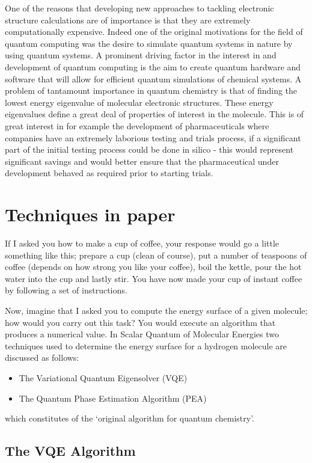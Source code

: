 \documentclass[12pt]{article}
\begin{document}
One of the reasons that developing new approaches to tackling electronic structure calculations are of importance is that they are extremely computationally expensive. Indeed one of the original motivations for the field of quantum computing was the desire to simulate quantum systems in nature by using quantum systems. A prominent driving factor in the interest in and development of quantum computing is the aim to create quantum hardware and software that will allow for efficient quantum simulations of chemical systems. A problem of tantamount importance in quantum chemistry is that of finding the lowest energy eigenvalue of molecular electronic structures. These energy eigenvalues define a great deal of properties of interest in the molecule. This is of great interest in for example the development of pharmaceuticals where companies have an extremely laborious testing and trials process, if a significant part of the initial testing process could be done in silico - this would represent significant savings and would better ensure that the pharmaceutical under development behaved as required prior to starting trials.
\section{Techniques in paper}
If I asked you how to make a cup of coffee, your response would go a little something like this; prepare a cup (clean of course), put a number of teaspoons of coffee (depends on how strong you like your coffee), boil the kettle, pour the hot water into the cup and lastly stir. You have now made your cup of instant coffee by following a set of instructions.

Now, imagine that I asked you to compute the energy surface of a given molecule; how would you carry out this task? You would execute an algorithm that produces a numerical value. In Scalar Quantum of Molecular Energies two techniques used to determine the energy surface for a hydrogen molecule are discussed as follows:
\begin{itemize}
\item The Variational Quantum Eigensolver (VQE)
\item The Quantum Phase Estimation Algorithm (PEA)
\end{itemize}
which constitutes of the ‘original algorithm for quantum chemistry’.

\subsection{The VQE Algorithm}
\end{document}
